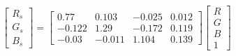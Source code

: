 \begin{equation}
\begin{bmatrix}
  R_s \\ G_s \\ B_s 
\end{bmatrix}=
\left[\begin{matrix}0.77 & 0.103 & -0.025 & 0.012\\ 
-0.122 & 1.29 & -0.172 & 0.119\\ 
-0.03 & -0.011 & 1.104 & 0.139\end{matrix}\right]
\begin{bmatrix}
  R \\ G \\ B \\ 1 
\end{bmatrix}
\end{equation}
